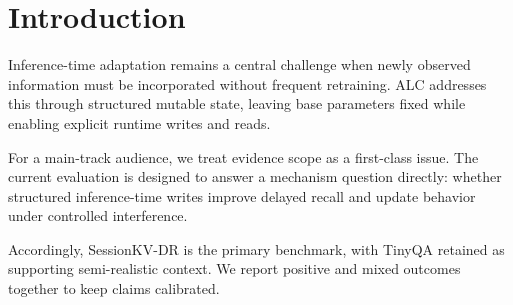 \section{Introduction}
Inference-time adaptation remains a central challenge when newly observed information must be incorporated without frequent retraining. ALC addresses this through structured mutable state, leaving base parameters fixed while enabling explicit runtime writes and reads.

For a main-track audience, we treat evidence scope as a first-class issue. The current evaluation is designed to answer a mechanism question directly: whether structured inference-time writes improve delayed recall and update behavior under controlled interference.

Accordingly, SessionKV-DR is the primary benchmark, with TinyQA retained as supporting semi-realistic context. We report positive and mixed outcomes together to keep claims calibrated.
